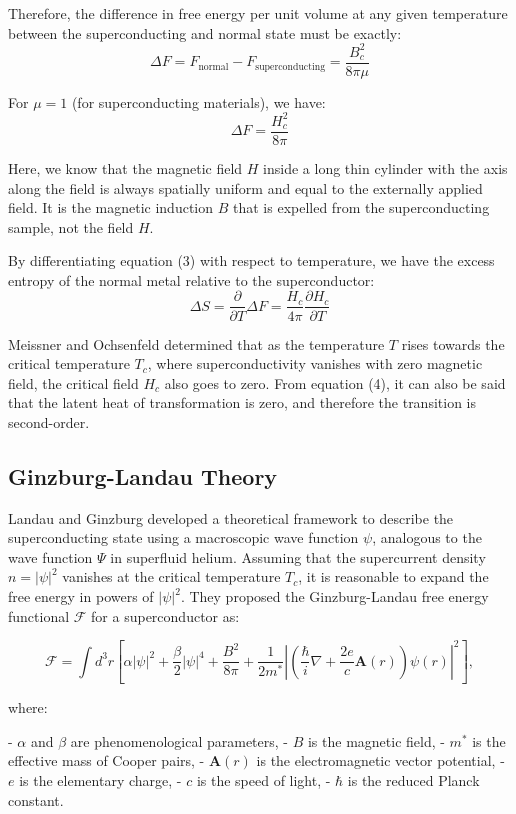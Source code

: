 \documentclass{article}
\begin{document}
Therefore, the difference in free energy per unit volume at any given temperature between the superconducting and normal state must be exactly:
\[
\Delta F = F_{\text{normal}} - F_{\text{superconducting}} = \frac{B_c^2}{8 \pi \mu}
\]

For \(\mu = 1\) (for superconducting materials), we have:
\[
\Delta F = \frac{H_c^2}{8 \pi} \tag{17}
\]

Here, we know that the magnetic field \(H\) inside a long thin cylinder with the axis along the field is always spatially uniform and equal to the externally applied field. It is the magnetic induction \(B\) that is expelled from the superconducting sample, not the field \(H\).

By differentiating equation (3) with respect to temperature, we have the excess entropy of the normal metal relative to the superconductor:
\[
\Delta S = \frac{\partial}{\partial T} \Delta F = \frac{H_c}{4 \pi} \frac{\partial H_c}{\partial T} \tag{18}
\]

Meissner and Ochsenfeld determined that as the temperature \(T\) rises towards the critical temperature \(T_c\), where superconductivity vanishes with zero magnetic field, the critical field \(H_c\) also goes to zero. From equation (4), it can also be said that the latent heat of transformation is zero, and therefore the transition is second-order.

\subsection{Ginzburg-Landau Theory}

Landau and Ginzburg developed a theoretical framework to describe the superconducting state using a macroscopic wave function \(\psi\), analogous to the wave function \(\Psi\) in superfluid helium. Assuming that the supercurrent density \(n = |\psi|^2\) vanishes at the critical temperature \(T_c\), it is reasonable to expand the free energy in powers of \(|\psi|^2\). They proposed the Ginzburg-Landau free energy functional \(\mathcal{F}\) for a superconductor as:

\[
\mathcal{F} = \int d^3r \left[ \alpha |\psi|^2 + \frac{\beta}{2} |\psi|^4 + \frac{B^2}{8\pi} + \frac{1}{2m^*} \left| \left( \frac{\hbar}{i} \nabla + \frac{2e}{c} \mathbf{A}(r) \right) \psi(r) \right|^2 \right],
\]

where:

- \(\alpha\) and \(\beta\) are phenomenological parameters,
- \(B\) is the magnetic field,
- \(m^*\) is the effective mass of Cooper pairs,
- \(\mathbf{A}(r)\) is the electromagnetic vector potential,
- \(e\) is the elementary charge,
- \(c\) is the speed of light,
- \(\hbar\) is the reduced Planck constant.
\end{document}
